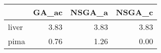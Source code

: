 \begin{tabular}{lrrr}
\toprule
{} &  GA\_ac &  NSGA\_a &  NSGA\_c \\
\midrule
liver &   3.83 &    3.83 &    3.83 \\
pima  &   0.76 &    1.26 &    0.00 \\
\bottomrule
\end{tabular}

